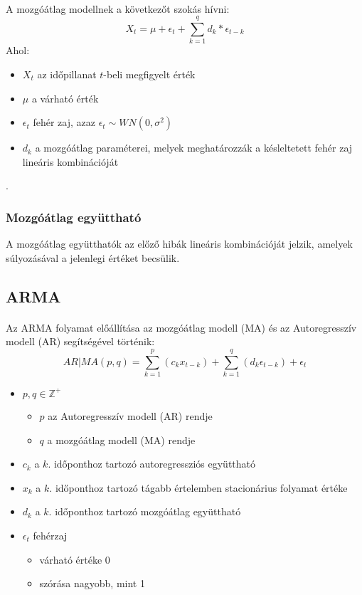 \documentclass[11pt,a4paper]{article}
\begin{document}
					\paragraph{}
						A mozgóátlag modellnek a következőt szokás hívni:
						$$X_t = \mu + \epsilon_t + \sum_{k = 1}^q d_k*\epsilon_{t-k}$$
						Ahol:
						\begin{itemize}
							\item $X_t$ az időpillanat $t$-beli megfigyelt érték
							\item $\mu$ a várható érték
							\item $\epsilon_t$ fehér zaj, azaz $\epsilon_t \sim WN(0, \sigma^2)$
							\item $d_k$ a mozgóátlag paraméterei, melyek meghatározzák a késleltetett fehér zaj lineáris kombinációját
						\end{itemize}.
					\subsubsection{Mozgóátlag együttható}
						A mozgóátlag együtthatók az előző hibák lineáris kombinációját jelzik, amelyek súlyozásával a jelenlegi értéket becsülik.
				\subsection{ARMA}
					\paragraph{}
						Az ARMA folyamat előállítása az mozgóátlag modell (MA) és az Autoregresszív modell (AR) segítségével történik:
						$$AR|MA(p,q) = \sum_{k = 1}^p (c_k x_{t-k}) + \sum_{k=1}^q(d_k \epsilon_{t-k}) + \epsilon_t$$
						\begin{itemize}
							\item $p,q \in \mathbb{Z}^+$
							\begin{itemize}
								\item $p$ az Autoregresszív modell (AR) rendje
								\item $q$ a mozgóátlag modell (MA) rendje
							\end{itemize}
							\item $c_k$ a $k.$ időponthoz tartozó autoregressziós együttható
							\item $x_k$ a $k.$ időponthoz tartozó tágabb értelemben stacionárius folyamat értéke
							\item $d_k$ a $k.$ időponthoz tartozó mozgóátlag együttható
							\item $\epsilon_t$ fehérzaj
							\begin{itemize}
								\item várható értéke 0
								\item szórása nagyobb, mint 1
							\end{itemize}
						\end{itemize}
\end{document}
